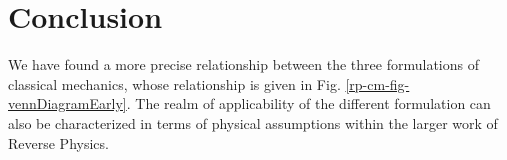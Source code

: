 \documentclass{techbrief}
\begin{document}
	\section{Conclusion}
		We have found a more precise relationship between the three formulations of classical mechanics, whose relationship is given in Fig. \ref{rp-cm-fig-vennDiagramEarly}. The realm of applicability of the different formulation can also be characterized in terms of physical assumptions within the larger work of Reverse Physics.
	
\end{document}
